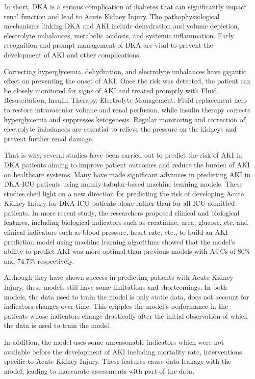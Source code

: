 \documentclass[../main.tex]{subfiles}
\begin{document}
In short, \gls{DKA} is a serious complication of diabetes that can significantly impact renal function and lead to Acute Kidney Injury. 
The pathophysiological mechanisms linking \gls{DKA} and \gls{AKI} include dehydration and volume depletion, electrolyte imbalances, metabolic acidosis, and systemic inflammation. 
Early recognition and prompt management of \gls{DKA} are vital to prevent the development of \gls{AKI} and other complications.

Correcting hyperglycemia, dehydration, and electrolyte imbalances have gigantic effect on preventing the onset of AKI. 
Once the risk was detected, the patient can be closely monitored for signs of \gls{AKI} and treated promptly with Fluid Resuscitation, Insulin Therapy, Electrolyte Management. 
Fluid replacement help to restore intravascular volume and renal perfusion, while insulin therapy corrects hyperglycemia and suppresses ketogenesis.
Regular monitoring and correction of electrolyte imbalances are essential to relieve the pressure on the kidneys and prevent further renal damage.


That is why, several studies have been carried out to predict the risk of \gls{AKI} in \gls{DKA} patients aiming to improve patient outcomes and reduce the burden of \gls{AKI} on healthcare systems.
Many have made significant advances in predicting \gls{AKI} in \gls{DKA-ICU} patients using mainly tabular-based machine learning models.
These studies shed light on a new direction for predicting the risk of developing Acute Kidney Injury for \gls{DKA-ICU} patients alone rather than for all ICU-admitted patients.
In more recent study, the researchers proposed clinical and biological features, including biological indicators such as creatinine, urea, glucose, etc. and clinical indicators such as blood pressure, heart rate, etc., to build an \gls{AKI} prediction model using machine learning algorithms showed that the model's ability to predict \gls{AKI} was more optimal than previous models with AUCs of 80\% and 74.7\% respectively.

Although they have shown success in predicting patients with Acute Kidney Injury, these models still have some limitations and shortcomings.
In both models, the data used to train the model is only static data, does not account for indicators changes over time.
This cripples the model's performance in the patients whose indicators change drastically after the initial observation of which the data is used to train the model.

In addition, the model uses some unreasonable indicators which were not available before the development of \gls{AKI} including mortality rate, interventions specific to Acute Kidney Injury.
These features cause data leakage with the model, leading to inaccurate assessments with part of the data.
\end{document}
